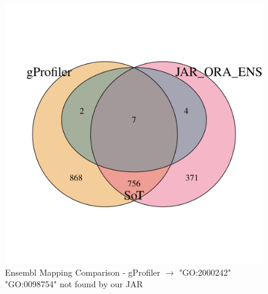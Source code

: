 \documentclass[12pt]{article}
\begin{document}
\begin{figure}[htpb]
\begin{minipage}{0.49\textwidth}
        \includegraphics[width=\textwidth]{./plots/ens_mappingCompgProfiler.png}
        \caption{Ensembl Mapping Comparison - gProfiler $\to$ "GO:2000242" "GO:0098754" not found by our JAR} 

        \label{fig:ens-mapping-gprofiler}
    \end{minipage}
\end{figure}
\end{document}
